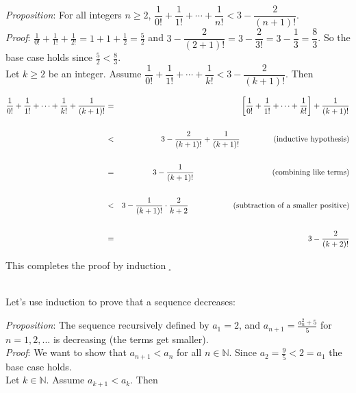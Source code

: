 \documentclass[12pt]{amsart}
\theoremstyle{definition}
\theoremstyle{remark}
\newcommand{\nats}{\mathbb N}
\begin{document}
\emph{Proposition}:  For all integers $n\geq 2$, $\dfrac{1}{0!}+\dfrac{1}{1!}+\cdots +\dfrac{1}{n!}<3-\dfrac{2}{(n+1)!}$.\\


\emph{Proof}:  $\displaystyle \frac{1}{0!}+\frac{1}{1!}+\frac{1}{2!}=1+1+\frac{1}{2}=\frac{5}{2}$  and $\displaystyle 3-\dfrac{2}{(2+1)!}=3-\dfrac{2}{3!}=3-\dfrac{1}{3}=\dfrac{8}{3}$.  So the base case holds since $\displaystyle \frac{5}{2}<\frac{8}{3}$.\\

Let $k\geq 2$ be an integer.  Assume $\dfrac{1}{0!}+\dfrac{1}{1!}+\cdots +\dfrac{1}{k!}<3-\dfrac{2}{(k+1)!}$.  Then

\begin{eqnarray*}
\dfrac{1}{0!}+\dfrac{1}{1!}+\cdots +\dfrac{1}{k!}+\dfrac{1}{(k+1)!} &=& \left[\dfrac{1}{0!}+\dfrac{1}{1!}+\cdots +\dfrac{1}{k!}\right]+\dfrac{1}{(k+1)!}\\
\\
&<& 3-\dfrac{2}{(k+1)!}+\dfrac{1}{(k+1)!}  \hspace{1.5cm} \mbox{(inductive hypothesis)}\\
\\
&=& 3-\dfrac{1}{(k+1)!}  \hspace{3.5cm} \mbox{(combining like terms)}\\
\\
&<& 3-\dfrac{1}{(k+1)!}\cdot\dfrac{2}{k+2}  \hspace{2cm} \mbox{(subtraction of a smaller positive)}\\
\\
&=& 3-\dfrac{2}{(k+2)!}\end{eqnarray*}

This completes the proof by induction$\;_{\square}$\\ \\


\newpage

Let's use induction to prove that a sequence decreases:

\medskip

\emph{Proposition}:   The sequence recursively defined by $a_{1}= 2$, and $\displaystyle a_{n+1}=\frac{a_{n}^{2} +5}{5}$ for $n=1,2,...$ is decreasing (the terms get smaller).\\


\emph{Proof}:  We want to show that $a_{n+1}<a_{n}$ for all $n\in\nats$.  Since $a_{2}=\frac{9}{5}<2=a_{1}$ the base case holds.\\


Let $k\in\nats$.  Assume $a_{k+1}<a_{k}$.  Then
\end{document}
